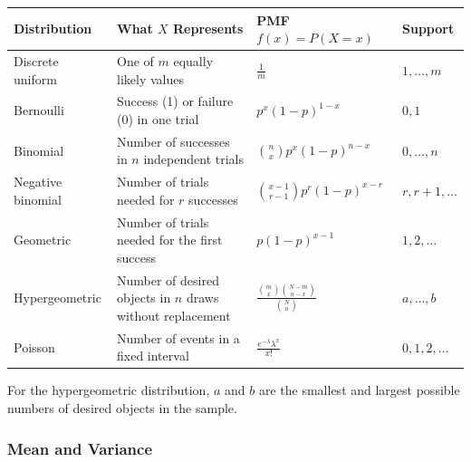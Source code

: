 ﻿\documentclass[12pt]{article}
\begin{document}
\begin{table}[H]
\centering
\small
\begin{tabularx}{\textwidth}{
    >{\raggedright\arraybackslash}p{2.6cm}
    >{\raggedright\arraybackslash}X
    >{\centering\arraybackslash}p{4.0cm}
    >{\centering\arraybackslash}p{1.8cm}
}
\toprule
\textbf{Distribution} & \textbf{What $X$ Represents}
& \textbf{PMF $f(x)=P(X=x)$} & \textbf{Support} \\
\midrule

Discrete uniform
& One of $m$ equally likely values
& $\displaystyle \frac{1}{m}$
& $1,\ldots,m$ \\

Bernoulli
& Success (1) or failure (0) in one trial
& $\displaystyle p^x(1-p)^{1-x}$
& $0,1$ \\

Binomial
& Number of successes in $n$ independent trials
& $\displaystyle \binom{n}{x}p^x(1-p)^{n-x}$
& $0,\ldots,n$ \\

Negative binomial
& Number of trials needed for $r$ successes
& $\displaystyle \binom{x-1}{r-1}p^r(1-p)^{x-r}$
& $r,r+1,\ldots$ \\

Geometric
& Number of trials needed for the first success
& $\displaystyle p(1-p)^{x-1}$
& $1,2,\ldots$ \\

Hypergeometric
& Number of desired objects in $n$ draws without replacement
& $\displaystyle \frac{\binom{m}{x}\binom{N-m}{n-x}}{\binom{N}{n}}$
& $a,\ldots,b$ \\

Poisson
& Number of events in a fixed interval
& $\displaystyle \frac{e^{-\lambda}\lambda^x}{x!}$
& $0,1,2,\ldots$ \\

\bottomrule
\end{tabularx}
\end{table}

\renewcommand{\arraystretch}{1}
For the hypergeometric distribution, \(a\) and \(b\) are the smallest and largest possible numbers of desired objects in the sample.
\subsubsection*{Mean and Variance}

\renewcommand{\arraystretch}{1.8}
\setlength{\tabcolsep}{6pt}
\end{document}
